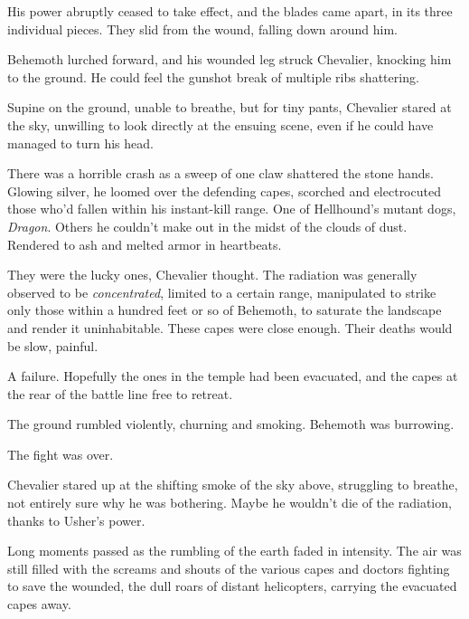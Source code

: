 His power abruptly ceased to take effect, and the blades came apart, in its three individual pieces.  They slid from the wound, falling down around him.



Behemoth lurched forward, and his wounded leg struck Chevalier, knocking him to the ground.  He could feel the gunshot break of multiple ribs shattering.



Supine on the ground, unable to breathe, but for tiny pants, Chevalier stared at the sky, unwilling to look directly at the ensuing scene, even if he could have managed to turn his head.



There was a horrible crash as a sweep of one claw shattered the stone hands.  Glowing silver, he loomed over the defending capes, scorched and electrocuted those who'd fallen within his instant-kill range.  One of Hellhound's mutant dogs, \emph{Dragon}.  Others he couldn't make out in the midst of the clouds of dust.  Rendered to ash and melted armor in heartbeats.



They were the lucky ones, Chevalier thought.  The radiation was generally observed to be \emph{concentrated}, limited to a certain range, manipulated to strike only those within a hundred feet or so of Behemoth, to saturate the landscape and render it uninhabitable.  These capes were close enough.  Their deaths would be slow, painful.



A failure.  Hopefully the ones in the temple had been evacuated, and the capes at the rear of the battle line free to retreat.



The ground rumbled violently, churning and smoking.  Behemoth was burrowing.



The fight was over.



Chevalier stared up at the shifting smoke of the sky above, struggling to breathe, not entirely sure why he was bothering.  Maybe he wouldn't die of the radiation, thanks to Usher's power.



Long moments passed as the rumbling of the earth faded in intensity.  The air was still filled with the screams and shouts of the various capes and doctors fighting to save the wounded, the dull roars of distant helicopters, carrying the evacuated capes away.



